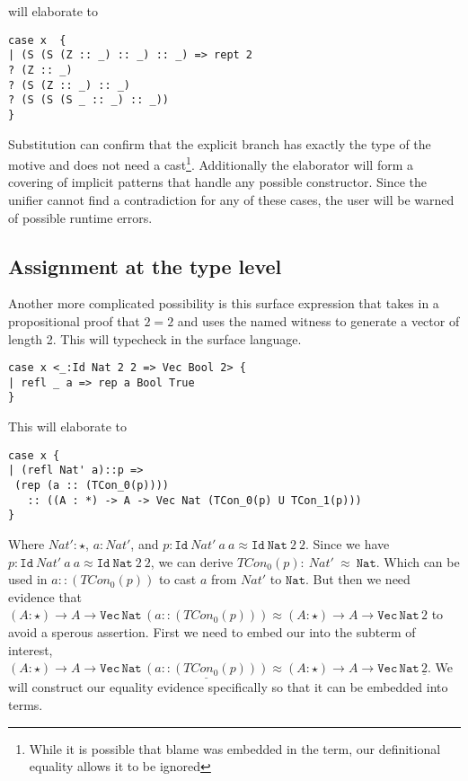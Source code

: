 will elaborate to
\begin{lstlisting}[basicstyle={\ttfamily\small}]
case x  {
| (S (S (Z :: _) :: _) :: _) => rept 2
? (Z :: _)
? (S (Z :: _) :: _)
? (S (S (S _ :: _) :: _))
}
\end{lstlisting}
 
Substitution can confirm that the explicit branch has exactly the type of the motive and does not need a cast\footnote{
  While it is possible that blame was embedded in the term, our definitional equality allows it to be ignored}.
Additionally the elaborator will form a covering of implicit patterns that handle any possible constructor.
Since the unifier cannot find a contradiction for any of these cases, the user will be warned of possible runtime errors.
 
\subsection{Assignment at the type level}
 
Another more complicated possibility is this surface expression that takes in a propositional proof that $2=2$ and uses the named witness to generate a vector of length 2.
This will typecheck in the surface language.
 
\begin{lstlisting}[basicstyle={\ttfamily\small}]
case x <_:Id Nat 2 2 => Vec Bool 2> {
| refl _ a => rep a Bool True
}
\end{lstlisting}
 
This will elaborate to
 
\begin{lstlisting}[basicstyle={\ttfamily\small}]
case x {
| (refl Nat' a)::p =>
 (rep (a :: (TCon_0(p)))) 
   :: ((A : *) -> A -> Vec Nat (TCon_0(p) U TCon_1(p)))
}
\end{lstlisting}
 
Where $Nat':\star$, $a:Nat'$, and $p:\mathtt{Id}\ Nat'\ a\ a\approx\mathtt{Id}\ \mathtt{Nat}\ 2\ 2$.
Since we have $p:\mathtt{Id}\ Nat'\ a\ a\approx\mathtt{Id}\ \mathtt{Nat}\ 2\ 2$, we can derive $TCon_0(p):\ Nat'\ \approx\ \mathtt{Nat}$.
Which can be used in $a::(TCon_0(p))$ to cast $a$ from $Nat'$ to $\mathtt{Nat}$.
But then we need evidence that $(A:\star)\rightarrow A\rightarrow\mathtt{Vec}\,\mathtt{Nat}\,(a :: (TCon_0(p)))\approx(A:\star)\rightarrow A\rightarrow\mathtt{Vec}\,\mathtt{Nat}\,2$ to avoid a sperous assertion.
First we need to embed our into the subterm of interest, $(A:\star)\rightarrow A\rightarrow\mathtt{Vec}\,\mathtt{Nat}\,\underline{(a :: (TCon_0(p)))}\approx(A:\star)\rightarrow A\rightarrow\mathtt{Vec}\,\mathtt{Nat}\,\underline{2}$.
We will construct our equality evidence specifically so that it can be embedded into terms.
 
